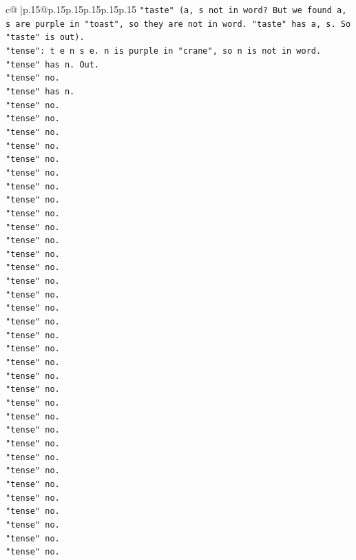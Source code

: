\documentclass{article}
\begin{document}
{\begin{supertabular}{c@{$\;$}|p{.15\linewidth}@{}p{.15\linewidth}p{.15\linewidth}p{.15\linewidth}p{.15\linewidth}p{.15\linewidth}}
{{{\texttt{"taste" (a, s not in word? But we found a, s are purple in "toast", so they are not in word. "taste" has a, s. So "taste" is out).} \\
\texttt{"tense": t e n s e. n is purple in "crane", so n is not in word. "tense" has n. Out.} \\
\texttt{"tense" no.} \\
\texttt{"tense" has n.} \\
\texttt{"tense" no.} \\
\texttt{"tense" no.} \\
\texttt{"tense" no.} \\
\texttt{"tense" no.} \\
\texttt{"tense" no.} \\
\texttt{"tense" no.} \\
\texttt{"tense" no.} \\
\texttt{"tense" no.} \\
\texttt{"tense" no.} \\
\texttt{"tense" no.} \\
\texttt{"tense" no.} \\
\texttt{"tense" no.} \\
\texttt{"tense" no.} \\
\texttt{"tense" no.} \\
\texttt{"tense" no.} \\
\texttt{"tense" no.} \\
\texttt{"tense" no.} \\
\texttt{"tense" no.} \\
\texttt{"tense" no.} \\
\texttt{"tense" no.} \\
\texttt{"tense" no.} \\
\texttt{"tense" no.} \\
\texttt{"tense" no.} \\
\texttt{"tense" no.} \\
\texttt{"tense" no.} \\
\texttt{"tense" no.} \\
\texttt{"tense" no.} \\
\texttt{"tense" no.} \\
\texttt{"tense" no.} \\
\texttt{"tense" no.} \\
\texttt{"tense" no.} \\
\texttt{"tense" no.} \\
\texttt{"tense" no.} \\
\texttt{"tense" no.} \\
}}}
\end{supertabular}}
\end{document}
